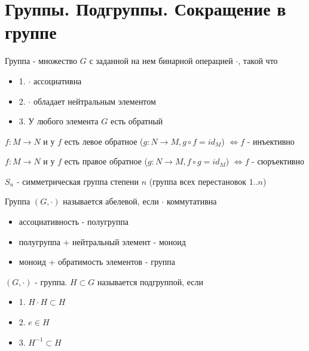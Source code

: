 \section{Группы. Подгруппы. Сокращение в группе}
\begin{conj}
    Группа - множество $G$ с заданной на нем бинарной операцией $\cdot$, такой что
    \begin{itemize}
    \item[] 1. $\cdot$ ассоциативна
    \item[] 2. $\cdot$ обладает нейтральным элементом
    \item[] 3. У любого элемента $G$ есть обратный
    \end{itemize}
\end{conj}


\begin{theorem-non}
$f: M \to N$ и у $f$ есть левое обратное ($g: N \to M, g \circ f = id_M$) $\Leftrightarrow f$ - инъективно

$f: M \to N$ и у $f$ есть правое обратное ($g: N \to M, f\circ g = id_M$) $\Leftrightarrow f$ - сюръективно
\end{theorem-non}

\begin{conj}
    $S_n$ - симметрическая группа степени $n$ (группа всех перестановок $1..n$)
\end{conj}
\begin{conj}
    Группа $(G, \cdot)$ называется абелевой, если $\cdot$ коммутативна
\end{conj}
\begin{itemize}
\item[] ассоциативность - полугруппа
\item[] полугруппа + нейтральный элемент - моноид
\item[] моноид + обратимость элементов - группа
\end{itemize}
\begin{conj}
    $(G, \cdot)$ - группа. $H \subset G$ называется подгруппой, если
    \begin{itemize}
    \item[] 1. $H\cdot H \subset H$
    \item[] 2. $e \in H$
    \item[] 3. $H^{-1} \subset H$
    \end{itemize}
\end{conj}